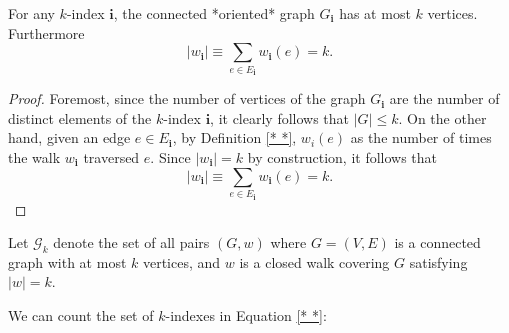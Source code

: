 \begin{lemma}
  \label{lem:}
  \uses{}
  For any $k$-index $\mathbf{i}$, the connected *oriented* graph $G_\mathbf{i}$ has at most $k$ vertices.
  Furthermore
  \[
  |w_\mathbf{i}| \equiv \sum_{e \in E_\mathbf{i}} w_\mathbf{i}(e) = k.
  \]
\end{lemma}
\begin{proof}
  Foremost, since the number of vertices of the graph $G_\mathbf{i}$ 
  are the number of distinct elements of the $k$-index $\mathbf{i}$, it clearly follows that $|G| \leq k$.
  On the other hand, given an edge $e \in E_\mathbf{i}$, by Definition \ref{* *}, $w_i(e)$ as the number of times the walk $w_\mathbf{i}$ traversed $e$. 
  Since $|w_\mathbf{i}| = k$ by construction, it follows that
  \[
  |w_\mathbf{i}| \equiv \sum_{e \in E_\mathbf{i}} w_\mathbf{i}(e) = k.
  \]
\end{proof}
\begin{definition}
  \label{def:}
  \uses{}
  Let $\mathcal{G}_k$ denote the set of all pairs $(G,w)$ where $G = (V,E)$ is a connected graph with at most $k$ vertices, and
  $w$ is a closed walk covering $G$ satisfying $|w| = k$.
\end{definition}
We can count the set of $k$-indexes in Equation \ref{* *}: 

